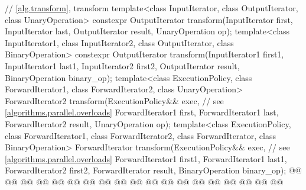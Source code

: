 \begin{codeblock}
{  // \ref{alg.transform}, transform
  template<class InputIterator, class OutputIterator, class UnaryOperation>
    constexpr OutputIterator
      transform(InputIterator first, InputIterator last,
                OutputIterator result, UnaryOperation op);
  template<class InputIterator1, class InputIterator2, class OutputIterator,
           class BinaryOperation>
    constexpr OutputIterator
      transform(InputIterator1 first1, InputIterator1 last1,
                InputIterator2 first2, OutputIterator result,
                BinaryOperation binary_op);
  template<class ExecutionPolicy, class ForwardIterator1, class ForwardIterator2,
           class UnaryOperation>
    ForwardIterator2
      transform(ExecutionPolicy&& exec, // see \ref{algorithms.parallel.overloads}
                ForwardIterator1 first, ForwardIterator1 last,
                ForwardIterator2 result, UnaryOperation op);
  template<class ExecutionPolicy, class ForwardIterator1, class ForwardIterator2,
           class ForwardIterator, class BinaryOperation>
    ForwardIterator
      transform(ExecutionPolicy&& exec, // see \ref{algorithms.parallel.overloads}
                ForwardIterator1 first1, ForwardIterator1 last1,
                ForwardIterator2 first2, ForwardIterator result,
                BinaryOperation binary_op);
  @@
    @@
        @@
      @@
      @@
        @@
    @@
        @@
      @@
      @@
        @@
    @@
        @@
        @@
      @@
        @@
      @@
        @@
                @@
}
\end{codeblock}
